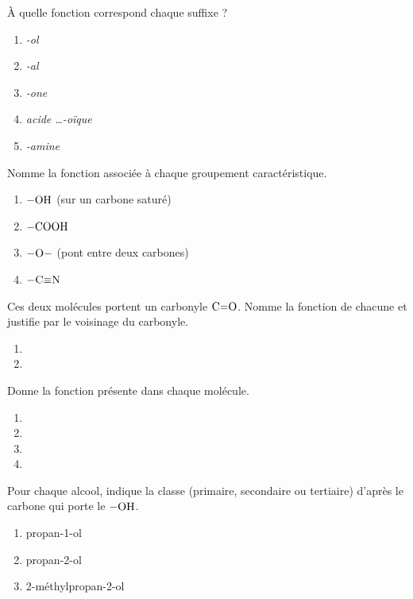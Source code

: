 \documentclass[11pt,a4paper]{article}
\begin{document}
\begin{exo}
À quelle fonction correspond chaque suffixe ?
\begin{enumerate}[label=\alph*)]
  \item \textit{-ol}
  \item \textit{-al}
  \item \textit{-one}
  \item \textit{acide \dots-oïque}
  \item \textit{-amine}
\end{enumerate}
\end{exo}

\begin{exo}
Nomme la fonction associée à chaque groupement caractéristique.
\begin{enumerate}[label=\alph*)]
  \item $-\ce{OH}$ (sur un carbone saturé)
  \item $-\ce{COOH}$
  \item $-\ce{O}-$ (pont entre deux carbones)
  \item $-\ce{C#N}$
\end{enumerate}
\end{exo}

\begin{exo}
Ces deux molécules portent un carbonyle $\ce{C=O}$. Nomme la fonction de chacune et justifie par le voisinage du carbonyle.
\begin{enumerate}[label=\alph*)]
  \item {}
  \item {}
\end{enumerate}
\end{exo}

\begin{exo}
Donne la fonction présente dans chaque molécule.
\begin{enumerate}[label=\alph*)]
  \item {}
  \item {}
  \item {}
  \item {}
\end{enumerate}
\end{exo}

\begin{exo}
Pour chaque alcool, indique la classe (primaire, secondaire ou tertiaire) d'après le carbone qui porte le $-\ce{OH}$.
\begin{enumerate}[label=\alph*)]
  \item propan-1-ol 
  \item propan-2-ol 
  \item 2-méthylpropan-2-ol 
\end{enumerate}
\end{exo}
\end{document}
